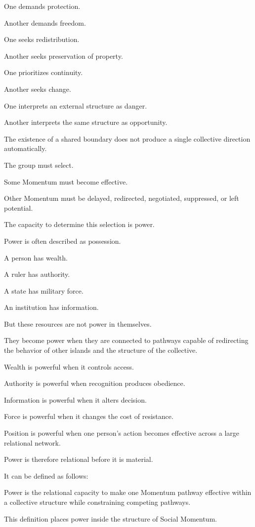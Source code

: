 One demands protection.

Another demands freedom.

One seeks redistribution.

Another seeks preservation of property.

One prioritizes continuity.

Another seeks change.

One interprets an external structure as danger.

Another interprets the same structure as opportunity.

The existence of a shared boundary does not produce a single collective direction automatically.

The group must select.

Some Momentum must become effective.

Other Momentum must be delayed, redirected, negotiated, suppressed, or left potential.

The capacity to determine this selection is power.

Power is often described as possession.

A person has wealth.

A ruler has authority.

A state has military force.

An institution has information.

But these resources are not power in themselves.

They become power when they are connected to pathways capable of redirecting the behavior of other islands and the structure of the collective.

Wealth is powerful when it controls access.

Authority is powerful when recognition produces obedience.

Information is powerful when it alters decision.

Force is powerful when it changes the cost of resistance.

Position is powerful when one person’s action becomes effective across a large relational network.

Power is therefore relational before it is material.

It can be defined as follows:

Power is the relational capacity to make one Momentum pathway effective within a collective structure while constraining competing pathways.

This definition places power inside the structure of Social Momentum.

